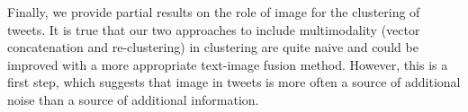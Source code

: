 Finally, we provide partial results on the role of image for the clustering of tweets. It is true that our two approaches to include multimodality (vector concatenation and re-clustering) in clustering are quite naive and could be improved with a more appropriate text-image fusion method. However, this is a first step, which suggests that image in tweets is more often a source of additional noise than a source of additional information.



